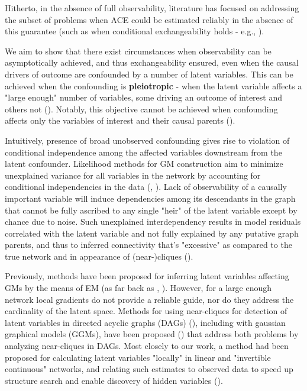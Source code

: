 \documentclass{article}
\begin{document}
Hitherto, in the absence of full observability, literature has focused on addressing the subset of problems when ACE could be estimated reliably in the absence of this guarantee (such as when conditional exchangeability holds - e.g., \cite{hernan_estimating_2006}).  

We aim to show that there exist circumstances when observability can be asymptotically achieved, and thus exchangeability ensured, even when the causal drivers of outcome are confounded by a number of latent variables.  This can be achieved when the confounding is \textbf{pleiotropic} - when the latent variable affects a "large enough" number of variables, some driving an outcome of interest and others not (\cite{anandkumar_learning_2013}).  Notably, this objective cannot be achieved when confounding affects only the variables of interest and their causal parents (\cite{damour_multi-cause_2019}).

Intuitively, presence of broad unobserved confounding gives rise to violation of conditional independence among the affected variables downstream from the latent confounder.  Likelihood methods for GM construction aim to minimize unexplained variance for all variables in the network by accounting for conditional independencies in the data (\cite{pearl_causality:_2000}, \cite{friedman_being_2013}).  Lack of observability of a causally important variable will induce dependencies among its descendants in the graph that cannot be fully ascribed to any single "heir" of the latent variable except by chance due to noise.  Such unexplained interdependency results in model residuals correlated with the latent variable and not fully explained by any putative graph parents, and thus to inferred connectivity that's "excessive" as compared to the true network and in appearance of (near-)cliques (\cite{elidan_discovering_2001}).  

Previously, methods have been proposed for inferring latent variables affecting GMs by the means of EM (as far back as \cite{friedman1997learning}, \cite{friedman1998bayesian}).  However, for a large enough network local gradients do not provide a reliable guide, nor do they address the cardinality of the latent space.  Methods for using near-cliques for detection of latent variables in directed acyclic graphs (DAGs) (\cite{elidan_discovering_2001}), including with gaussian graphical models (GGMs), have been proposed (\cite{silva_learning_2006}) that address both problems by analyzing near-cliques in DAGs.  Most closely to our work, a method had been proposed for calculating latent variables "locally" in linear and "invertible continuous" networks, and relating such estimates to observed data to speed up structure search and enable discovery of hidden variables (\cite{elidan_ideal_2007}).
\end{document}
